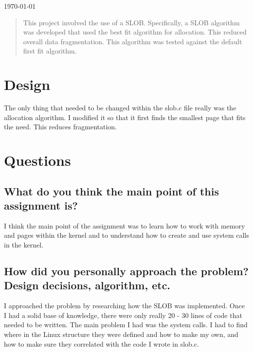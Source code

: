 \documentclass[journal,letterpaper,draftclsnofoot,onecolumn,10pt]{IEEEtran}
\begin{document}
\begin{titlepage}

{\large \today}\\[3cm] %

\begin{abstract}
This project involved the use of a SLOB. Specifically, a SLOB algorithm was developed that used the best fit algorithm for allocation. This reduced overall data fragmentation. This algorithm was tested against the default first fit algorithm.
\end{abstract}

\vfill %

\pagebreak

\end{titlepage}

\section{Design}
The only thing that needed to be changed within the slob.c file really was the allocation algorithm. I modified it so that it first finds the smallest page that fits the need. This reduces fragmentation.
\section{Questions}
\subsection{What do you think the main point of this assignment is?}
I think the main point of the assignment was to learn how to work with memory and pages within the kernel and to understand how to create and use system calls in the kernel.
\subsection{How did you personally approach the problem? Design decisions, algorithm, etc.}
I approached the problem by researching how the SLOB was implemented. Once I had a solid base of knowledge, there were only really 20 - 30 lines of code that needed to be written. The main problem I had was the system calls. I had to find where in the Linux structure they were defined and how to make my own, and how to make sure they correlated with the code I wrote in slob.c.
\end{document}
